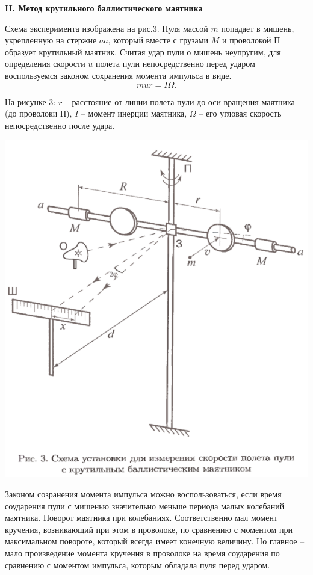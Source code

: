 \documentclass[a4paper,12pt]{article} %
\begin{document}
\begin{center}
{\bf II. Метод крутильного баллистического маятника}
\end{center}

Схема эксперимента изображена на рис.3. Пуля массой $m$ попадает в мишень, укрепленную на стержне $aa$, который вместе с грузами $M$ и проволокой П образует крутильный маятник. Считая удар пули о мишень неупругим, для определения скорости $u$ полета пули непосредственно перед ударом воспользуемся законом сохранения момента импульса в виде. \[ mur = I\Omega .\]

На рисунке 3: $r$ -- расстояние от линии полета пули до оси вращения маятника (до проволоки П), $I$ -- момент инерции маятника, $\Omega$ -- его угловая скорость непосредственно после удара.

\begin{center}
\includegraphics[scale=0.8]{1.2.1 3}
\end{center}



Законом созранения момента импульса можно воспользоваться, если время соударения пули с мишенью значительно меньше периода малых колебаний маятника. Поворот маятника при колебаниях. Соответственно мал момент кручения, возникающий при этом в проволоке, по сравнению с моментом при максимальном повороте, который всегда имеет конечную величину. Но главное -- мало произведение момента кручения в проволоке на время соударения по сравнению с моментом импульса, которым обладала пуля перед ударом.
\end{document}
